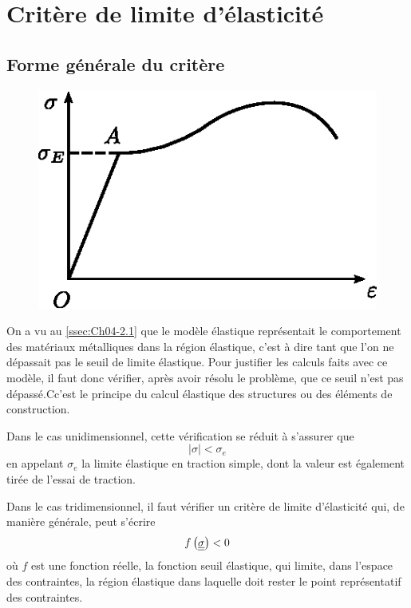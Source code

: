 \section{Critère de limite d'élasticité}
\subsection{Forme générale du critère}
\begin{figure}
    \begin{center}
        \includegraphics{../images/T1_Ch05-01}
    \end{center}
\end{figure}
On a vu au \ref{ssec:Ch04-2.1} que le modèle élastique représentait le comportement des matériaux métalliques dans la région élastique, c'est à dire tant que l'on ne dépassait pas le seuil de limite élastique.
Pour justifier les calculs faits avec ce modèle, il faut donc vérifier, après avoir résolu le problème, que ce seuil n'est pas dépassé.Cc'est le principe du calcul élastique des structures ou des éléments de construction.

Dans le cas unidimensionnel, cette vérification se réduit à s'assurer que 
\begin{equation}
    |\sigma| < \sigma_e
    \label{eq:Ch05-057}
\end{equation}
en appelant $\sigma_e$ la limite élastique en traction simple, dont la valeur est également tirée de l'essai de traction. 

Dans le cas tridimensionnel, il faut vérifier un critère de limite d'élasticité qui, de manière générale, peut s'écrire 
\begin{equation}
    f\left( \underline{\underline{\sigma}} \right) < 0
    \label{eq:Ch05-058}
\end{equation}
où $f$ est une fonction réelle, la fonction seuil élastique, qui limite, dans l'espace des contraintes, la région élastique dans laquelle doit rester le point représentatif des contraintes.

